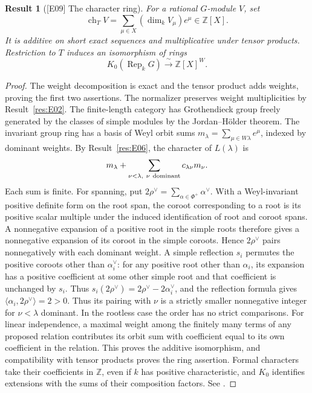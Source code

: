 \documentclass[11pt,a4paper,openany,oneside]{book}
\theoremstyle{resultstyle}
\newtheorem{statement}{Result}[chapter]
\newenvironment{result}[2]{\clubpenalty=10000\begin{statement}[\textnormal{[#1]} #2]\leavevmode\label{res:#1}\ignorespaces}{\end{statement}}
\theoremstyle{definition}
\numberwithin{equation}{chapter}
\begin{document}
\begin{result}{E09}{The character ring}
For a rational \(G\)-module \(V\), set
\[
 \operatorname{ch}_T V=\sum_{\mu\in X}(\dim_k V_\mu)e^\mu\in\mathbb Z[X].
\]
It is additive on short exact sequences and multiplicative under tensor products. Restriction to \(T\) induces an isomorphism of rings
\[
 K_0(\operatorname{Rep}_k G)\xrightarrow{\ \sim\ }\mathbb Z[X]^W .
\]
\end{result}
\begin{proof}
The weight decomposition is exact and the tensor product adds weights, proving the first two assertions. The normalizer preserves weight multiplicities by Result~\ref{res:E02}. The finite-length category has Grothendieck group freely generated by the classes of simple modules by the Jordan--H\"older theorem. The invariant group ring has a basis of Weyl orbit sums \(m_\lambda=\sum_{\mu\in W\lambda}e^\mu\), indexed by dominant weights. By Result~\ref{res:E06}, the character of \(L(\lambda)\) is
\[
 m_\lambda+\sum_{\nu<\lambda,\ \nu\ {\rm dominant}} c_{\lambda\nu}m_\nu .
\]
Each sum is finite. For spanning, put
\(2\rho^\vee=\sum_{\alpha\in\Phi^+}\alpha^\vee\).
With a Weyl-invariant positive definite form on the root
span, the coroot corresponding to a root is its positive
scalar multiple under the induced identification of root
and coroot spans. A nonnegative expansion of a positive root
in the simple roots therefore gives a nonnegative expansion
of its coroot in the simple coroots. Hence \(2\rho^\vee\)
pairs nonnegatively with each dominant weight. A simple
reflection \(s_i\) permutes the positive coroots other than
\(\alpha_i^\vee\): for any positive root other than
\(\alpha_i\), its expansion has a positive coefficient at some
other simple root and that coefficient is unchanged by
\(s_i\). Thus
\(s_i(2\rho^\vee)=2\rho^\vee-2\alpha_i^\vee\), and the
reflection formula gives
\(\langle\alpha_i,2\rho^\vee\rangle=2>0\). Thus its pairing with \(\nu\) is a strictly smaller nonnegative integer for \(\nu<\lambda\) dominant. In the rootless case the order has no strict comparisons. For linear independence, a maximal weight among the finitely many terms of any proposed relation contributes its orbit sum with coefficient equal to its own coefficient in the relation. This proves the additive isomorphism, and compatibility with tensor products proves the ring assertion. Formal characters take their coefficients in \(\mathbb Z\), even if \(k\) has positive characteristic, and \(K_0\) identifies extensions with the sums of their composition factors. See \cite[22.36--22.38]{milne}.
\end{proof}
\end{document}
